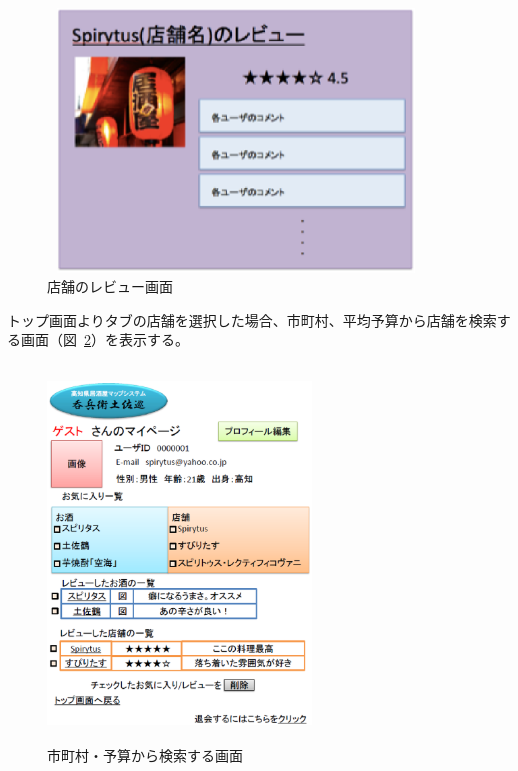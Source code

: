 \documentclass[a4j,titlepage]{jarticle}
\begin{document}
\begin {figure}[!htbp]
    \begin{center}
    \includegraphics [height=7cm, width=10cm]{36.eps}
    \caption {店舗のレビュー画面}
    \label {fig:36}
    \end{center}
\end {figure}




トップ画面よりタブの店舗を選択した場合、市町村、平均予算から店舗を検索する画面（図~\ref{fig:37}）を表示する。




\begin {figure}[!htbp]
    \begin{center}
    \includegraphics [height=10cm, width=7cm]{37.eps}
    \caption {市町村・予算から検索する画面}
    \label {fig:37}
    \end{center}
\end {figure}
\end{document}
